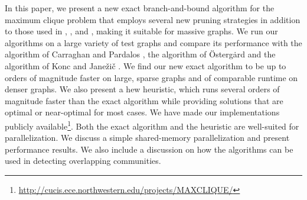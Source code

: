 
In this paper, we present a new exact branch-and-bound
algorithm for the maximum clique problem that employs 
several new pruning strategies in addition to those used in \cite{pardalos},
\cite{ostergard},  \cite{citeulike:7905505} and \cite{konc2007improved},
making it suitable for massive graphs.
We run our algorithms on a large variety of test graphs and compare its performance with the
algorithm of Carraghan and Pardalos \cite{pardalos}, the algorithm of \"{O}sterg\.{a}rd \cite{ostergard} and the algorithm of Konc and Jane\v{z}i\v{c} \cite{konc2007improved}. 
We find our new exact algorithm to be up to orders of magnitude faster on large,
sparse graphs and of comparable runtime on denser graphs.
We also present a hew heuristic, which runs several orders of magnitude faster than the exact algorithm while providing solutions that are optimal or near-optimal for most cases.
We have made our implementations publicly available\footnote{\url{http://cucis.ece.northwestern.edu/projects/MAXCLIQUE/}}.
Both the exact algorithm and the heuristic are well-suited for parallelization.
We discuss a simple shared-memory parallelization and present performance results.
We also include a discussion on how the algorithms can be used in
detecting overlapping communities.




